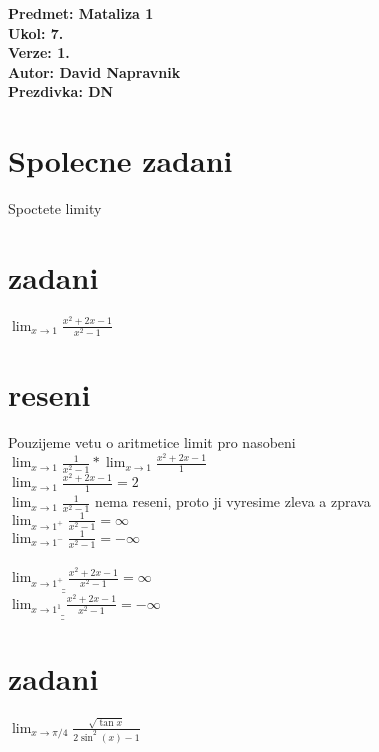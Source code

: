 \documentclass[a4paper]{article}
\def\doubleunderline#1{\underline{\underline{#1}}}
\begin{document}
\noindent
\textbf{Predmet: Mataliza 1}\\
\textbf{Ukol: 7.}\\
\textbf{Verze: 1.}\\
\textbf{Autor: David Napravnik}\\
\textbf{Prezdivka: DN}

\section*{Spolecne zadani}
Spoctete limity

\section*{zadani}
$\lim_{x \rightarrow 1} \frac{x^2 + 2x -1}{x^2-1}$

\section*{reseni}
Pouzijeme vetu o aritmetice limit pro nasobeni\\
$
\lim_{x \rightarrow 1} \frac{1}{x^2-1} *
\lim_{x \rightarrow 1} \frac{x^2 + 2x -1}{1}
$\\
$\lim_{x \rightarrow 1} \frac{x^2 + 2x -1}{1} = 2$\\
$\lim_{x \rightarrow 1} \frac{1}{x^2-1}$ nema reseni, proto ji vyresime zleva a zprava\\
$\lim_{x \rightarrow 1^{+}} \frac{1}{x^2-1} = \infty$\\
$\lim_{x \rightarrow 1^{-}} \frac{1}{x^2-1} = -\infty$\\
\\
$\doubleunderline{\lim_{x \rightarrow 1^+} \frac{x^2 + 2x -1}{x^2-1}} = \infty$\\
$\doubleunderline{\lim_{x \rightarrow 1^1} \frac{x^2 + 2x -1}{x^2-1}} = -\infty$








\section*{zadani}
$\lim_{x \rightarrow \pi / 4} \frac{\sqrt{\tan x}}{2 \sin^2 (x) -1}$
\end{document}
